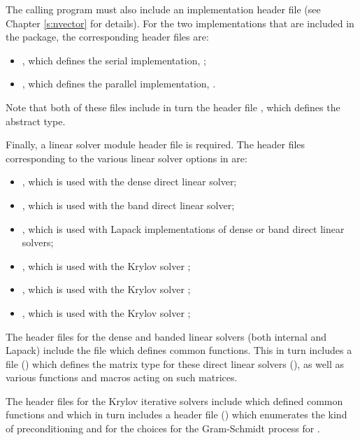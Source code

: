 The calling program must also include an {\nvector} implementation header file
(see Chapter \ref{s:nvector} for details).
For the two {\nvector} implementations that are included in the {\kinsol} package,
the corresponding header files are:
%
\begin{itemize}
\item {}, 
  which defines the serial implementation, {\nvecs};
\item {}, 
  which defines the parallel {\mpi} implementation, {\nvecp}.
\end{itemize}
%
Note that both of these files include in turn the header file , which 
defines the abstract  type. 

Finally, a linear solver module header file is required. 
The header files corresponding to the various linear solver options in
{\kinsol} are:
\begin{itemize}
\item {},
  which is used with the dense direct linear solver;

\item {}, 
  which is used with the band direct linear solver;

\item {},
  which is used with Lapack implementations of dense or band direct linear solvers;

\item {}, 
  which is used with the Krylov solver {\spgmr};

\item {}, 
  which is used with the Krylov solver {\spbcg};

\item {}, 
  which is used with the Krylov solver {\sptfqmr};

\end{itemize}

The header files for the dense and banded linear solvers (both
internal and Lapack) include the file  which
defines common functions.  This in turn includes a file
() which defines the matrix type for these
direct linear solvers (), as well as various functions and
macros acting on such matrices.

The header files for the Krylov iterative solvers include
 which defined common functions and which in turn
includes a header file () which enumerates
the kind of preconditioning and for the choices for the Gram-Schmidt
process for {\spgmr}.

